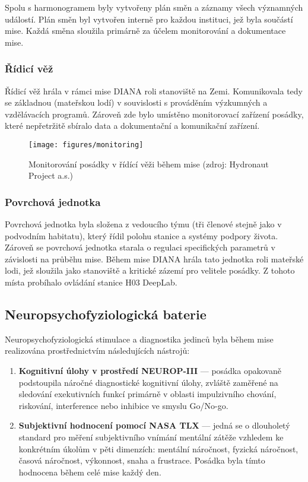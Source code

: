 Spolu s harmonogramem byly vytvořeny plán směn a záznamy všech významných
událostí. Plán směn byl vytvořen interně pro každou instituci, jež byla součástí
mise. Každá směna sloužila primárně za účelem monitorování a dokumentace mise.

\subsubsection{Řídicí věž}
\label{subsubsec:ridici_vez}
Řídicí věž hrála v rámci mise DIANA roli stanoviště na Zemi. Komunikovala tedy
se základnou (mateřskou lodí) v souvislosti s prováděním výzkumných a
vzdělávacích programů. Zároveň zde bylo umístěno monitorovací zařízení posádky,
které nepřetržitě sbíralo data a dokumentační a komunikační zařízení.

\begin{figure}[h]
    \begin{center}
        \texttt{[image: figures/monitoring]}
        \caption{Monitorování posádky v řídící věži během mise (zdroj: Hydronaut Project a.s.)}
        \label{fig:monitoring}
    \end{center}
\end{figure}

\subsubsection{Povrchová jednotka}
\label{subsubsec:povrchova_jednotka}
Povrchová jednotka byla složena z vedoucího týmu (tři členové stejně jako v
podvodním habitatu), který řídil polohu stanice a systémy podpory života.
Zároveň se povrchová jednotka starala o regulaci specifických parametrů v
závislosti na průběhu mise. Během mise DIANA hrála tato jednotka roli mateřské
lodi, jež sloužila jako stanoviště a kritické zázemí pro velitele posádky. Z
tohoto místa probíhalo ovládání stanice H03 DeepLab.

\subsection{Neuropsychofyziologická baterie}
\label{subsubsec:neuro_testy}
Neuropsychofyziologická stimulace a diagnostika jedinců byla během mise
realizována prostřednictvím následujících nástrojů:
\begin{enumerate}
    \item \textbf{Kognitivní úlohy v prostředí NEUROP-III} --- posádka opakovaně
          podstoupila náročné diagnostické kognitivní úlohy, zvláště zaměřené na
          sledování exekutivních funkcí primárně v oblasti impulzivního chování,
          riskování, interference nebo inhibice ve smyslu Go/No-go.
    \item \textbf{Subjektivní hodnocení pomocí NASA TLX} --- jedná se o
          dlouholetý standard pro měření subjektivního vnímání mentální zátěže
          vzhledem ke konkrétním úkolům v pěti dimenzích: mentální náročnost, fyzická
          náročnost, časová náročnost, výkonnost, snaha a frustrace. Posádka byla
          tímto hodnocena během celé mise každý den.
\end{enumerate}

